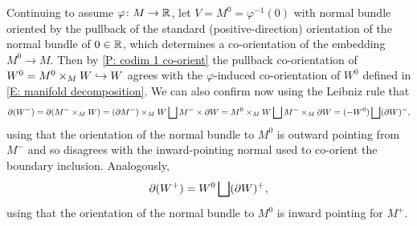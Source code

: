 \begin{example}\label{E: codim 1 pullbacks}
	Continuing to assume $\varphi \colon M \to \mathbb{R}$, let $V = M^0 = \varphi^{-1}(0)$ with normal bundle oriented by the pullback of the standard (positive-direction) orientation of the normal bundle of $0 \in \mathbb{R}$, which determines a co-orientation of the embedding $M^0 \to M$.
	Then by \cref{P: codim 1 co-orient} the pullback co-orientation of $W^0 = M^0 \times_M W \hookrightarrow W$ agrees with the $\varphi$-induced co-orientation of $W^0$ defined in \cref{E: manifold decomposition}.
	We can also confirm now using the Leibniz rule that
	$$\partial(W^-) = \partial(M^- \times_M W) = (\partial M^-) \times_M W \bigsqcup M^- \times \partial W = M^0 \times_M W \bigsqcup M^- \times_M \partial W = (-W^0) \bigsqcup (\partial W)^-,$$
	using that the orientation of the normal bundle to $M^0$ is outward pointing from $M^-$ and so disagrees with the inward-pointing normal used to co-orient the boundary inclusion.
	Analogously,
	$$\partial (W^+) = W^0 \bigsqcup (\partial W)^+,$$
	using that the orientation of the normal bundle to $M^0$ is inward pointing for $M^+$.
\end{example}

\begin{comment}
	\begin{proof}
		Again it is clear that $f \times_M g = g|_{W^0}$ as maps.
		Suppose given structural co-orientations.
		As $f$ is an embedding, we have $K_f = 0$, while $V^\perp$ is spanned by $\nu$; note that as $\nu_0$ maps to $\nu$, we write simply $\nu$ in the local decomposition of $TW$.
		The structural co-orientation of $f$ is $(\beta_{W^\perp} \wedge \beta_I, \beta_{W^\perp} \wedge \beta_I \wedge \beta_\nu)$, which agrees with the assumed co-orientation for $f$.
		So the co-orientation of the pullback will be the structural orientation or not according to whether the structural co-orientation of $g$ agrees with the given co-orientation of $g$ or not.
		The structural co-orientation of $g$ is $(\beta_{K_g} \wedge \beta_I \wedge \beta_\nu, \beta_{W^\perp} \wedge \beta_I \wedge \beta_\nu)$, while the structural co-orientation of the pullback is $(\beta_{K_g} \wedge \beta_I, \beta_{W^\perp} \wedge \beta_I \wedge \beta_\nu)$.
		If the given co-orientation for $g$ agrees with the structural orientation, then the claimed co-orientation for $g|_{W^0}$ is the composition of the structural co-orientation for $g$ with $(\beta_{W^0},\beta_{W^0} \wedge \beta_{\nu})$.
		In this last expression we are free to choose any $\beta_{W^0}$ we like, so we can let $\beta_{W^0} = \beta_{K_g} \wedge \beta_I$.
		Then the claimed composite co-orientation is $(\beta_{K_g} \wedge \beta_I, \beta_{W^\perp} \wedge \beta_I \wedge \beta_\nu)$, which agrees with the pullback co-orientation as claimed.
		If the given co-orientation of $g$ disagrees with the structural co-orientation, this changes the sign of both the pullback co-orientation and of the representative of the co-orientation of $g$ used in our composite but not the sign of $(\beta_{W^0},\beta_{W^0} \wedge \beta_{\nu})$.
		So again the pullback co-orientation agrees with the claimed composite.
	\end{proof}
\end{comment}

